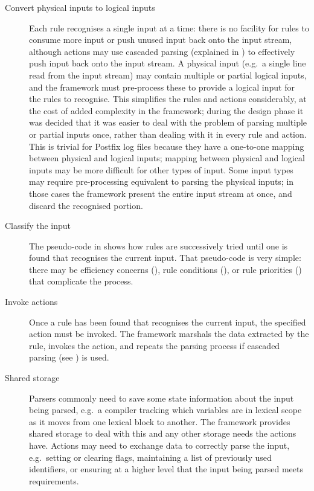 \begin{description}
    \item [Convert physical inputs to logical inputs] Each rule recognises
        a single input at a time: there is no facility for rules to consume
        more input or push unused input back onto the input stream,
        although actions may use cascaded parsing (explained in
        ) to effectively push input
        back onto the input stream.  A physical input (e.g.\ a single line
        read from the input stream) may contain multiple or partial logical
        inputs, and the framework must pre-process these to provide a
        logical input for the rules to recognise.  This simplifies the
        rules and actions considerably, at the cost of added complexity in
        the framework; during the design phase it was decided that it was
        easier to deal with the problem of parsing multiple or partial
        inputs once, rather than dealing with it in every rule and action.
        This is trivial for Postfix log files because they have a
        one-to-one mapping between physical and logical inputs; mapping
        between physical and logical inputs may be more difficult for other
        types of input.  Some input types may require pre-processing
        equivalent to parsing the physical inputs; in those cases the
        framework present the entire input stream at once, and discard the
        recognised portion.

    \item [Classify the input]  The pseudo-code in  shows how rules are
        successively tried until one is found that recognises the current
        input.  That pseudo-code is very simple: there may be efficiency
        concerns (), rule conditions
        (), or rule priorities
        () that complicate the process.

    \item [Invoke actions]  Once a rule has been found that recognises the
        current input, the specified action must be invoked.  The framework
        marshals the data extracted by the rule, invokes the action, and
        repeats the parsing process if cascaded parsing (see
        ) is used.

    \item [Shared storage]  Parsers commonly need to save some state
        information about the input being parsed, e.g.\ a compiler tracking
        which variables are in lexical scope as it moves from one lexical
        block to another.  The framework provides shared storage to deal
        with this and any other storage needs the actions have.  Actions
        may need to exchange data to correctly parse the input, e.g.\
        setting or clearing flags, maintaining a list of previously used
        identifiers, or ensuring at a higher level that the input being
        parsed meets requirements.


\end{description}
